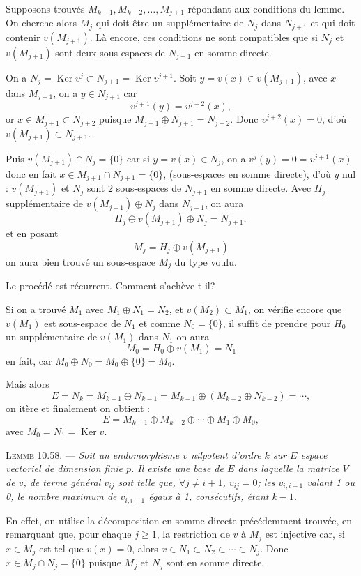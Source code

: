 Supposons trouvés $M_{k-1},M_{k-2},\ldots,M_{j+1}$ répondant aux conditions du lemme. On cherche alors $M_j$ qui doit être un supplémentaire de $N_j$ dans $N_{j+1}$ et qui doit contenir $v(M_{j+1})$.
Là encore, ces conditions ne sont compatibles que si $N_j$ et $v(M_{j+1})$ sont deux sous-espaces de $N_{j+1}$ en somme directe.

On a $N_j=\operatorname{Ker}v^j\subset N_{j+1}=\operatorname{Ker}v^{j+1}$.
Soit $y=v(x)\in v(M_{j+1})$, avec $x$ dans $M_{j+1}$, on a $y\in N_{j+1}$ car
\[
v^{j+1}(y)=v^{j+2}(x),
\]
or $x\in M_{j+1}\subset N_{j+2}$ puisque $M_{j+1}\oplus N_{j+1}=N_{j+2}$. Donc $v^{j+2}(x)=0$, d'où $v(M_{j+1})\subset N_{j+1}$.

Puis $v(M_{j+1})\cap N_j=\{0\}$ car si $y=v(x)\in N_j$, on a $v^j(y)=0=v^{j+1}(x)$ donc en fait $x\in M_{j+1}\cap N_{j+1}=\{0\}$, (sous-espaces en somme directe), d'où $y$ nul : $v(M_{j+1})$ et $N_j$ sont 2 sous-espaces de $N_{j+1}$ en somme directe. Avec $H_j$ supplémentaire de $v(M_{j+1})\oplus N_j$ dans $N_{j+1}$, on aura
\[
H_j\oplus v(M_{j+1})\oplus N_j=N_{j+1},
\]
et en posant
\[
M_j=H_j\oplus v(M_{j+1})
\]
on aura bien trouvé un sous-espace $M_j$ du type voulu. \bookend

Le procédé est récurrent. Comment s'achève-t-il?

Si on a trouvé $M_1$ avec $M_1\oplus N_1=N_2$, et $v(M_2)\subset M_1$, on vérifie encore que $v(M_1)$ est sous-espace de $N_1$ et comme $N_0=\{0\}$, il suffit de prendre pour $H_0$ un supplémentaire de $v(M_1)$ dans $N_1$ on aura
\[
M_0=H_0\oplus v(M_1)=N_1
\]
en fait, car $M_0\oplus N_0=M_0\oplus\{0\}=M_0$.

Mais alors
\[
E=N_k=M_{k-1}\oplus N_{k-1}
=M_{k-1}\oplus(M_{k-2}\oplus N_{k-2})=\cdots,
\]
on itère et finalement on obtient :
\[
E=M_{k-1}\oplus M_{k-2}\oplus\cdots\oplus M_1\oplus M_0,
\]
avec $M_0=N_1=\operatorname{Ker}v$.

\medskip\noindent\textsc{Lemme 10.58.} --- \emph{Soit un endomorphisme $v$ nilpotent d'ordre $k$ sur $E$ espace vectoriel de dimension finie $p$. Il existe une base de $E$ dans laquelle la matrice $V$ de $v$, de terme général $v_{ij}$ soit telle que, $\forall j\ne i+1$, $v_{ij}=0$; les $v_{i,i+1}$ valant 1 ou 0, le nombre maximum de $v_{i,i+1}$ égaux à 1, consécutifs, étant $k-1$.}

En effet, on utilise la décomposition en somme directe précédemment trouvée, en remarquant que, pour chaque $j\ge1$, la restriction de $v$ à $M_j$ est injective car, si $x\in M_j$ est tel que $v(x)=0$, alors $x\in N_1\subset N_2\subset\cdots\subset N_j$. Donc $x\in M_j\cap N_j=\{0\}$ puisque $M_j$ et $N_j$ sont en somme directe.

